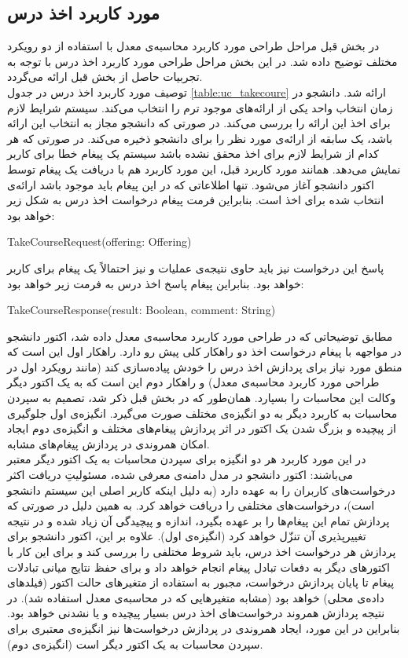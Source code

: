 \subsection{مورد کاربرد اخذ درس}
\label{subsection:take_course_uc_design}
در بخش قبل مراحل طراحی مورد کاربرد محاسبه‌ی معدل با استفاده از دو رویکرد مختلف توضیح داده شد. در این بخش مراحل طراحی مورد کاربرد اخذ درس با توجه به تجربیات حاصل از بخش قبل ارائه می‌گردد. \\
توصیف مورد کاربرد اخذ درس در جدول \ref{table:uc_takecoure} ارائه شد. دانشجو در زمان انتخاب واحد یکی از ارائه‌های موجود ترم را انتخاب می‌کند. سیستم شرایط لازم برای اخذ این ارائه را بررسی می‌کند. در صورتی که دانشجو مجاز به انتخاب این ارائه باشد، یک سابقه از ارائه‌ی مورد نظر را برای دانشجو ذخیره می‌کند. در صورتی که هر کدام از شرایط لازم برای اخذ محقق نشده باشد سیستم یک پیغام خطا برای کاربر نمایش می‌دهد.
همانند مورد کاربرد قبل،‌ این مورد کاربرد هم با دریافت یک پیغام توسط اکتور دانشجو آغاز می‌شود. تنها اطلاعاتی که در این پیغام باید موجود باشد ارائه‌ی انتخاب شده برای اخذ است. بنابراین فرمت پیغام درخواست اخذ درس به شکل زیر خواهد بود:
\begin{latin}
TakeCourseRequest(offering: Offering)
\end{latin}
پاسخ این درخواست نیز باید حاوی نتیجه‌ی عملیات و نیز احتمالاً یک پیغام برای کاربر خواهد بود. بنابراین پیغام پاسخ اخذ درس به فرمت زیر خواهد بود:
\begin{latin}
TakeCourseResponse(result: Boolean, comment: String)
\end{latin}
مطابق توضیحاتی که در طراحی مورد کاربرد محاسبه‌ی معدل داده ‌شد، اکتور دانشجو در مواجهه با پیغام درخواست اخذ دو راهکار کلی پیش رو دارد. راهکار اول این است که منطق مورد نیاز برای پردازش اخذ درس را خودش پیاده‌سازی کند (مانند رویکرد اول در طراحی مورد کاربرد محاسبه‌ی معدل) و راهکار دوم این است که به یک اکتور دیگر وکالت این محاسبات را بسپارد. همان‌طور که در بخش قبل ذکر شد،‌ تصمیم به سپردن محاسبات به کاربرد دیگر به دو انگیزه‌ی مختلف صورت می‌گیرد. انگیزه‌ی اول جلوگیری از پیچیده و بزرگ شدن یک اکتور در اثر پردازش پیغام‌های مختلف و انگیزه‌ی دوم ایجاد امکان همروندی در پردازش پیغام‌های مشابه.\\
در این مورد کاربرد هر دو انگیزه برای سپردن محاسبات به یک اکتور دیگر معتبر می‌باشند: اکتور دانشجو در مدل دامنه‌ی معرفی شده، مسئولیتِ دریافت اکثر درخواست‌های کاربران را به عهده دارد (به دلیل اینکه کاربر اصلی این سیستم دانشجو است)، درخواست‌های مختلفی را دریافت خواهد کرد. به همین دلیل در صورتی که  پردازش تمام این پیغام‌ها را بر عهده بگیرد، اندازه و پیچیدگی آن زیاد شده و در نتیجه تغییرپذیری آن تنزّل خواهد کرد (انگیزه‌ی اول). علاوه بر این، اکتور دانشجو برای پردازش هر درخواست اخذ درس، باید شروط مختلفی را بررسی کند و برای این کار با اکتورهای دیگر به دفعات تبادل پیغام انجام خواهد داد و برای حفظ نتایج میانی تبادلات پیغام تا پایان پردازش درخواست، مجبور به استفاده از متغیرهای حالت اکتور (فیلدهای داده‌ی محلی) خواهد بود (مشابه متغیرهایی که در محاسبه‌ی معدل استفاده شد). در نتیجه پردازش همروند درخواست‌های اخذ درس بسیار پیچیده و یا نشدنی خواهد بود. بنابراین در این مورد، ایجاد همروندی در پردازش درخواست‌ها نیز انگیزه‌ی معتبری برای سپردن محاسبات به یک اکتور دیگر است (انگیزه‌ی دوم). \\
